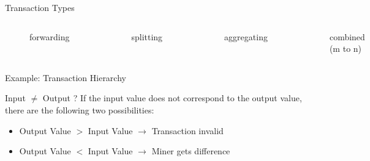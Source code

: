 \documentclass[]{beamer}
\begin{document}
\begin{frame}{Transaction Types}
\begin{columns}

	\vspace{1cm}
	\begin{figure}
		
		\vspace{2.5em}
		\caption*{forwarding}
	\end{figure} 
	\vspace{0.4cm}
	\begin{figure}
		
		\caption*{splitting}
	\end{figure}
	\begin{figure}
		
		\caption*{aggregating}
	\end{figure}
	\vspace{0.5cm}
	\begin{figure}
		
		\caption*{combined (m to n)}
	\end{figure}
	
\end{columns}
\end{frame}

\begin{frame}{Example: Transaction Hierarchy}
\resizebox{\textwidth}{!}{

}
\end{frame}


\begin{frame}{Input $\neq$ Output ?}
If the input value does not correspond to the output value, there are the following two possibilities:
\vspace{1em}
\begin{itemize}
    \item<1->{Output Value $>$ Input Value $\rightarrow$ Transaction invalid}
    \item<2->{Output Value $<$ Input Value $\rightarrow$ Miner gets difference}
    \end{itemize} 
    \vspace{1.5em}
\end{frame}
\end{document}
